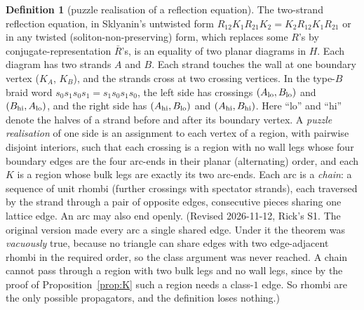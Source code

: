 \documentclass[11pt]{article}
\theoremstyle{definition}
\newtheorem{definition}[theorem]{Definition}
\begin{document}
\begin{definition}[puzzle realisation of a reflection equation]\label{def:real}
The two-strand reflection equation, in Sklyanin's untwisted form
$R_{12}K_1R_{21}K_2=K_2R_{12}K_1R_{21}$ or in any twisted (soliton-non-preserving) form, which
replaces some $R$'s by conjugate-representation $\bar R$'s, is an equality of two planar diagrams in
$H$. Each diagram has two strands $A$ and $B$. Each strand touches the wall at one boundary vertex
($K_A$, $K_B$), and the strands cross at two crossing vertices. In the type-$B$ braid word
$s_0s_1s_0s_1=s_1s_0s_1s_0$, the left side has crossings $(A_{\rm lo},B_{\rm lo})$ and
$(B_{\rm hi},A_{\rm lo})$, and the right side has $(A_{\rm hi},B_{\rm lo})$ and
$(A_{\rm hi},B_{\rm hi})$. Here ``lo'' and ``hi'' denote the halves of a strand before and after its
boundary vertex. A \emph{puzzle realisation} of one side is an assignment to each vertex of a region,
with pairwise disjoint interiors, such that each crossing is a region with no wall legs whose four
boundary edges are the four arc-ends in their planar (alternating) order, and each $K$ is a region
whose bulk legs are exactly its two arc-ends. Each arc is a \emph{chain}: a sequence of unit rhombi
(further crossings with spectator strands), each traversed by the strand through a pair of opposite
edges, consecutive pieces sharing one lattice edge. An arc may also end openly. (Revised 2026-11-12,
Rick's S1. The original version made every arc a single shared edge. Under it the theorem was
\emph{vacuously} true, because no triangle can share edges with two edge-adjacent rhombi in the
required order, so the class argument was never reached. A chain cannot pass through a region with
two bulk legs and no wall legs, since by the proof of Proposition~\ref{prop:K} such a region needs a
class-$1$ edge. So rhombi are the only possible propagators, and the definition loses nothing.)
\end{definition}
\end{document}
